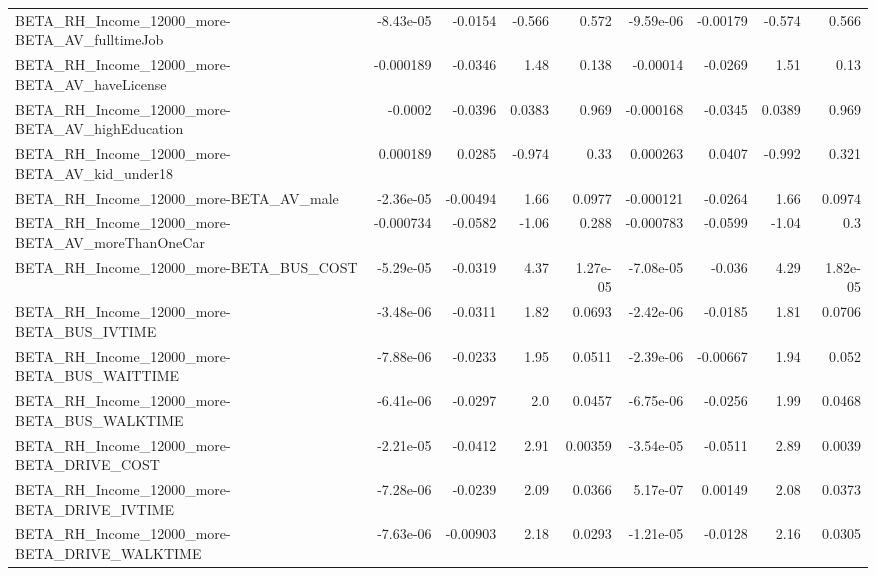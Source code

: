 \begin{tabular}{lrrrrrrrr}
BETA\_RH\_Income\_12000\_more-BETA\_AV\_fulltimeJob      &   -8.43e-05 &      -0.0154 &    -0.566 &    0.572 &  -9.59e-06 &    -0.00179 &       -0.574 &         0.566 \\
BETA\_RH\_Income\_12000\_more-BETA\_AV\_haveLicense      &   -0.000189 &      -0.0346 &      1.48 &    0.138 &   -0.00014 &     -0.0269 &         1.51 &          0.13 \\
BETA\_RH\_Income\_12000\_more-BETA\_AV\_highEducation    &     -0.0002 &      -0.0396 &    0.0383 &    0.969 &  -0.000168 &     -0.0345 &       0.0389 &         0.969 \\
BETA\_RH\_Income\_12000\_more-BETA\_AV\_kid\_under18      &    0.000189 &       0.0285 &    -0.974 &     0.33 &   0.000263 &      0.0407 &       -0.992 &         0.321 \\
BETA\_RH\_Income\_12000\_more-BETA\_AV\_male             &   -2.36e-05 &     -0.00494 &      1.66 &   0.0977 &  -0.000121 &     -0.0264 &         1.66 &        0.0974 \\
BETA\_RH\_Income\_12000\_more-BETA\_AV\_moreThanOneCar   &   -0.000734 &      -0.0582 &     -1.06 &    0.288 &  -0.000783 &     -0.0599 &        -1.04 &           0.3 \\
BETA\_RH\_Income\_12000\_more-BETA\_BUS\_COST            &   -5.29e-05 &      -0.0319 &      4.37 & 1.27e-05 &  -7.08e-05 &      -0.036 &         4.29 &      1.82e-05 \\
BETA\_RH\_Income\_12000\_more-BETA\_BUS\_IVTIME          &   -3.48e-06 &      -0.0311 &      1.82 &   0.0693 &  -2.42e-06 &     -0.0185 &         1.81 &        0.0706 \\
BETA\_RH\_Income\_12000\_more-BETA\_BUS\_WAITTIME        &   -7.88e-06 &      -0.0233 &      1.95 &   0.0511 &  -2.39e-06 &    -0.00667 &         1.94 &         0.052 \\
BETA\_RH\_Income\_12000\_more-BETA\_BUS\_WALKTIME        &   -6.41e-06 &      -0.0297 &       2.0 &   0.0457 &  -6.75e-06 &     -0.0256 &         1.99 &        0.0468 \\
BETA\_RH\_Income\_12000\_more-BETA\_DRIVE\_COST          &   -2.21e-05 &      -0.0412 &      2.91 &  0.00359 &  -3.54e-05 &     -0.0511 &         2.89 &        0.0039 \\
BETA\_RH\_Income\_12000\_more-BETA\_DRIVE\_IVTIME        &   -7.28e-06 &      -0.0239 &      2.09 &   0.0366 &   5.17e-07 &     0.00149 &         2.08 &        0.0373 \\
BETA\_RH\_Income\_12000\_more-BETA\_DRIVE\_WALKTIME      &   -7.63e-06 &     -0.00903 &      2.18 &   0.0293 &  -1.21e-05 &     -0.0128 &         2.16 &        0.0305 \\

\end{tabular}

